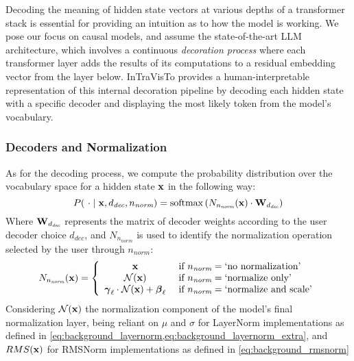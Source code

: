 Decoding the meaning of hidden state vectors at various depths of a transformer stack is essential for providing an intuition as to how the model is working.
We pose our focus on causal models, and assume the state-of-the-art LLM architecture, which involves a continuous \emph{decoration process} where each transformer layer adds the results of its computations to a residual embedding vector from the layer below.
InTraVisTo provides a human-interpretable representation of this internal decoration pipeline by decoding each hidden state with a specific decoder and displaying the most likely token from the model's vocabulary.

\subsubsection{Decoders and Normalization}\label{sssec:method_intravisto_decoding_norm}

As for the decoding process, we compute the probability distribution over the vocabulary space for a hidden state $\bm{\mathbf{x}}$ in the following way:
\begin{equation}
    \label{eq:method_intravisto_decoding}
    P(\ \cdot \mid \bm{\mathbf{x}}, d_\textit{dec}, n_\textit{norm}) = \mathrm{softmax}\left(N_{n_\textit{norm}}(\bm{\mathbf{x}}) \cdot \bm{\mathbf{W}}_{d_\textit{dec}}\right)
\end{equation}
Where $\bm{\mathbf{W}}_{d_\textit{dec}}$ represents the matrix of decoder weights according to the user decoder choice $d_\textit{dec}$, and $N_{n_\textit{norm}}$ is used to identify the normalization operation selected by the user through $n_\textit{norm}$:
\begin{equation}
    N_{n_\textit{norm}}(\bm{\mathbf{x}}) = 
    \label{eq:method_intravisto_normalization}
    \left\{
    \begin{array}{cl}
        \bm{\mathbf{x}} &\ \text{if}\ n_\textit{norm} = \text{`no normalization'} \\
        \mathcal{N}{(\bm{\mathbf{x}})} &\ \text{if}\ n_\textit{norm} = \text{`normalize only'} \\
        \bm{\mathbf{\gamma}}_\ell \cdot \mathcal{N}{(\bm{\mathbf{x}})} + \bm{\mathbf{\beta}}_\ell &\ \text{if}\ n_\textit{norm} = \text{`normalize and scale'}
    \end{array}
    \right.
\end{equation}
Considering $\mathcal{N}{(\bm{\mathbf{x}})}$ the normalization component of the model's final normalization layer, being reliant on $\mu$ and $\sigma$ for LayerNorm implementations as defined in \cref{eq:background_layernorm,eq:background_layernorm_extra}, and $RMS(\bm{\mathbf{x}})$ for RMSNorm implementations as defined in \cref{eq:background_rmsnorm}

